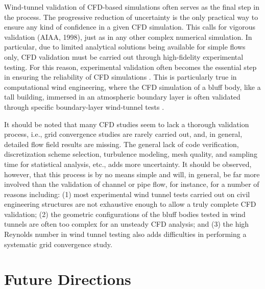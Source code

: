 Wind-tunnel validation of CFD-based simulations often serves as the final step in the process. The progressive reduction of uncertainty \citep{roache1998verification} is the only practical way to ensure any kind of confidence in a given CFD simulation. This calls for vigorous validation (AIAA, 1998), just as in any other complex numerical simulation. In particular, due to limited analytical solutions being available for simple flows only, CFD validation must be carried out through high-fidelity experimental testing. For this reason, experimental validation often becomes the essential step in ensuring the reliability of CFD simulations \citep{Oberkampf et al. 2004; oberkampf2004verification; oberkampf2008verification; roy2011comprehensive}. This is particularly true in computational wind engineering, where the CFD simulation of a bluff body, like a tall building, immersed in an atmospheric boundary layer is often validated through specific boundary-layer wind-tunnel tests \citep{yu1998parametric,yu2013simulation}.

It should be noted that many CFD studies seem to lack a thorough validation process, i.e., grid convergence studies are rarely carried out, and, in general, detailed flow field results are missing. The general lack of code verification, discretization scheme selection, turbulence modeling, mesh quality, and sampling time for statistical analysis, etc., adds more uncertainty. It should be observed, however, that this process is by no means simple and will, in general, be far more involved than the validation of channel or pipe flow, for instance, for a number of reasons including: (1) most experimental wind tunnel tests carried out on civil engineering structures are not exhaustive enough to allow a truly complete CFD validation; (2) the geometric configurations of the bluff bodies tested in wind tunnels are often too complex for an unsteady CFD analysis; and (3) the high Reynolds number in wind tunnel testing also adds difficulties in performing a systematic grid convergence study.

\section{Future Directions}
\label{sec:resp_cfd_wind_flow_modeling}

